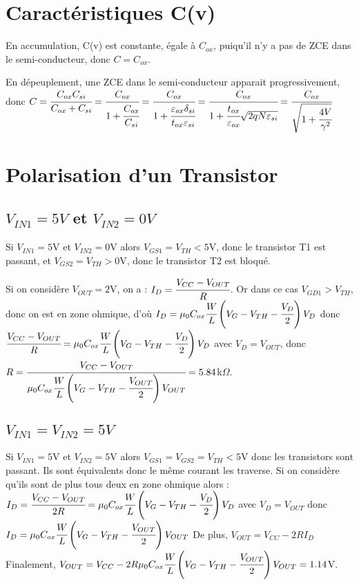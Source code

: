 \documentclass[10pt]{article}
\begin{document}
 
 \section{Caractéristiques C(v)}
  En accumulation, C(v) est constante, égale à $C_{ox}$, puiqu’il n’y a pas de ZCE dans le semi-conducteur, donc $C=C_{ox}$.

  En dépeuplement, une ZCE dans le semi-conducteur apparait progressivement, donc $C=\cfrac{C_{ox} C_{si}}{C_{ox}+C_{si}}=
  \cfrac{C_{ox}}{1+\cfrac{C_{ox}}{C_{si}}}=
  \cfrac{C_{ox}}{1+\cfrac{\varepsilon_{ox}\delta_{si}}{t_{ox}\varepsilon_{si}}}=
  \cfrac{C_{ox}}{1+\cfrac{t_{ox}}{\varepsilon_{ox}}\sqrt{2qN\varepsilon_{si}}}=
  \cfrac{C_{ox}}{\sqrt{1+\cfrac{4V}{\gamma^2}}}$
 
  \newpage
 
 \section{Polarisation d’un Transistor}
 
 \subsection{$V_{IN1} = 5V$ et $V_{IN2} = 0V$}
 
 Si $V_{IN1} = 5$V et $V_{IN2} = 0$V alors $V_{GS1} = V_{TH} < 5$V, donc le transistor T1 est passant,
 et $V_{GS2} = V_{TH} > 0$V, donc le transistor T2 est bloqué.
 
 Si on considère $V_{OUT} = 2$V, on a : $I_{D} = \cfrac{V_{CC} - V_{OUT}}{R}$.
 Or dans ce cas $V_{GD1} > V_{TH}$, donc on est en zone ohmique, d'où
 $I_D = \mu_0 C_{ox} \cfrac{W}{L} \left(V_G - V_{TH} - \cfrac{V_D}{2}\right)V_D$
 donc $\cfrac{V_{CC} - V_{OUT}}{R} = \mu_0 C_{ox} \cfrac{W}{L} \left(V_G - V_{TH} - \cfrac{V_D}{2}\right)V_D$ avec $V_D = V_{OUT}$,
 donc $R =\cfrac{V_{CC} - V_{OUT}}{\mu_0 C_{ox} \cfrac{W}{L} \left(V_G - V_{TH} - \cfrac{V_{OUT}}{2}\right)V_{OUT}} = 5.84$k$\Omega$.
 
 \subsection{$V_{IN1} = V_{IN2} = 5V$}
 
 Si $V_{IN1} = 5$V et $V_{IN2} = 5$V alors $V_{GS1} = V_{GS2} = V_{TH} < 5$V  donc les transistors sont passant. Ils sont équivalents donc le même courant les traverse.
 Si on considère qu'ils sont de plus tous deux en zone ohmique alors :
 $I_{D} = \cfrac{V_{CC} - V_{OUT}}{2 R} = \mu_0 C_{ox} \cfrac{W}{L} \left(V_G - V_{TH} - \cfrac{V_D}{2}\right)V_D$
 avec $V_D = V_{OUT}$ donc
 $I_D = \mu_0 C_{ox} \cfrac{W}{L} \left(V_G - V_{TH} - \cfrac{V_{OUT}}{2}\right)V_{OUT}$
 De plus, $V_{OUT} = V_{CC} - 2 R I_D$
 Finalement, $V_{OUT} = V_{CC} - 2 R \mu_0 C_{ox} \cfrac{W}{L} \left(V_G - V_{TH} - \cfrac{V_{OUT}}{2}\right)V_{OUT} = 1.14$V.
 
\end{document}
